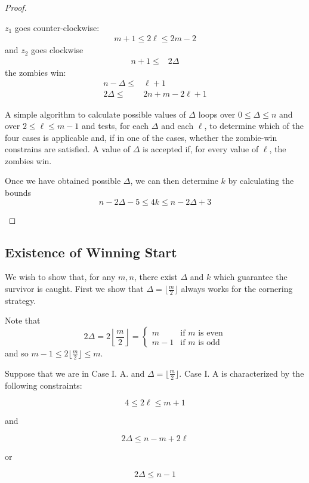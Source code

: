 \begin{proof}
\begin{proofpart}
  $z_1$ goes counter-clockwise:
  \begin{align*}
   m + 1 \leq 2 \ell \leq 2m - 2
  \end{align*}
  and $z_2$ goes clockwise
  \begin{align*}
   n+1 \leq & 2 \Delta
  \end{align*}
  the zombies win:
  \begin{align*}
   n - \Delta \leq & \ell + 1           \\
   2 \Delta \leq   & 2n + m - 2\ell + 1
  \end{align*}

A simple algorithm to calculate possible values of $\Delta$ loops
over $0 \leq \Delta \leq n$ and over $2 \leq \ell \leq m-1$ and tests,
for each $\Delta$ and each $\ell$, to determine which of the four cases is
applicable and, if in one of the cases, whether the zombie-win constrains are
satisfied. A value of $\Delta$ is accepted if, for every value of $\ell$, the
zombies win.

Once we have obtained possible $\Delta$, we can then determine $k$ by
calculating the bounds
\[ n - 2\Delta -5 \leq 4k \leq n-2\Delta +3 \]


 \end{proofpart}
\end{proof}

\newpage
\subsection{Existence of Winning Start}

We wish to show that, for any $m, n$, there exist $\Delta$ and $k$
which guarantee the survivor is caught.
First we show that $\Delta = \lfloor \frac{m}{2} \rfloor$ always
works for the cornering strategy.

Note that
\[
2\Delta = 2 \left\lfloor \frac{m}{2} \right\rfloor =
\begin{cases}
m & \text{if $m$ is even} \\
m -1 & \text{if $m$ is odd}
\end{cases}
\]
and so $m -1 \leq 2 \lfloor \frac{m}{2} \rfloor \leq m$.

Suppose that we are in Case I. A. and $\Delta = \lfloor \frac{m}{2} \rfloor$.
Case I. A is characterized by the following constraints:

\[ 4 \leq 2 \ell \leq m+1 \]
\begin{center}and\end{center}
\[ 2\Delta \leq n - m + 2\ell \]
\begin{center}or\end{center}
\[ 2\Delta \leq n-1 \]

